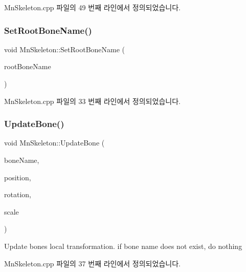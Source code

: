 Mn\+Skeleton.\+cpp 파일의 49 번째 라인에서 정의되었습니다.

\mbox{\label{class_m_n_l_1_1_mn_skeleton_a3e82493cbe23cb9194e0386f63062a42}} 
\subsubsection{\texorpdfstring{Set\+Root\+Bone\+Name()}{SetRootBoneName()}}
{\footnotesize\ttfamily void Mn\+Skeleton\+::\+Set\+Root\+Bone\+Name (\begin{DoxyParamCaption}\item[{const std\+::string \&}]{root\+Bone\+Name }\end{DoxyParamCaption})}



Mn\+Skeleton.\+cpp 파일의 33 번째 라인에서 정의되었습니다.

\mbox{\label{class_m_n_l_1_1_mn_skeleton_a7c3019ae3e241b3c6569fb4639b511b8}} 
\subsubsection{\texorpdfstring{Update\+Bone()}{UpdateBone()}}
{\footnotesize\ttfamily void Mn\+Skeleton\+::\+Update\+Bone (\begin{DoxyParamCaption}\item[{const std\+::string \&}]{bone\+Name,  }\item[{const Direct\+X\+::\+Simple\+Math\+::\+Vector3 \&}]{position,  }\item[{const Direct\+X\+::\+Simple\+Math\+::\+Quaternion \&}]{rotation,  }\item[{const Direct\+X\+::\+Simple\+Math\+::\+Vector3 \&}]{scale }\end{DoxyParamCaption})}

Update bone\textquotesingle{}s local transformation. if bone name does not exist, do nothing 

Mn\+Skeleton.\+cpp 파일의 37 번째 라인에서 정의되었습니다.




